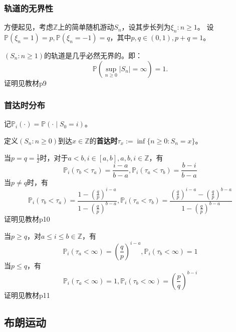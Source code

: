 \documentclass[main]{subfiles}
\begin{document}
\subsubsection{轨道的无界性}
方便起见，考虑\(\mathbb{Z}\)上的简单随机游动\(S_n\)，设其步长列为\(\xi_n:n \geq 1\)。
设\(\mathbb{P}(\xi_n=1)=p,\mathbb{P}(\xi_n=-1)=q\)，其中\(p,q \in (0,1),p+q=1\)。
\begin{theorem}\label{the:jihubirjwujp}
  \((S_n:n \geq 1)\)的轨道是几乎必然无界的。即：
  \begin{equation}
    \mathbb{P}(\sup_{n \geq 0}|S_n|=\infty)=1.
  \end{equation}
  证明见教材p9
\end{theorem}
\subsubsection{首达时分布}
\begin{definition}\label{def:Pi}
  记\(\mathbb{P}_i(\cdot)=\mathbb{P}(\cdot\mid S_0=i)\)。
\end{definition}

\begin{definition}\label{def:uzdaui}
  定义\((S_n:n \geq 0)\)到达\(x \in \mathbb{Z}\)的\textbf{首达时}\(\tau_x:=\inf \{n \geq 0:S_n=x\}\)。
\end{definition}
\begin{theorem}\label{the:122}
  当\(p=q=\frac{1}{2}\)时，对于\(a<b,i \in [a,b],a,b,i \in \mathbb{Z}\)，有
  \begin{equation}
    \mathbb{P}_i(\tau_b<\tau_a)=\frac{i-a}{b-a},\mathbb{P}_i(\tau_a<\tau_b)=\frac{b-i}{b-a}
  \end{equation}
  当\(p \neq q\)时，有
  \begin{equation}
    \mathbb{P}_i(\tau_b<\tau_a)=\frac{1-(\frac{q}{p})^{i-a}}{1-(\frac{q}{p})^{b-a}},
    \mathbb{P}_i(\tau_a<\tau_b)=\frac{(\frac{q}{p})^{i-a}-(\frac{q}{p})^{b-a}}{1-(\frac{q}{p})^{b-a}}
  \end{equation}
  证明见教材p10
\end{theorem}
\begin{theorem}\label{the:1.2.3}
  当\(p \geq q\)，对\(a \leq i \leq b \in \mathbb{Z}\)，有
  \begin{equation}
    \mathbb{P}_i(\tau_a<\infty)=(\frac{q}{p})^{i-a},\mathbb{P}_i(\tau_b<\infty)=1
  \end{equation}
  当\(p \leq q\)，有
  \begin{equation}
    \mathbb{P}_i(\tau_a<\infty)=1,\mathbb{P}_i(\tau_b<\infty)=(\frac{p}{q})^{b-i}
  \end{equation}
  证明见教材p11
\end{theorem}
\subsection{布朗运动}

\ifSubfilesClassLoaded{%
  \printindex }{%
}
\end{document}

